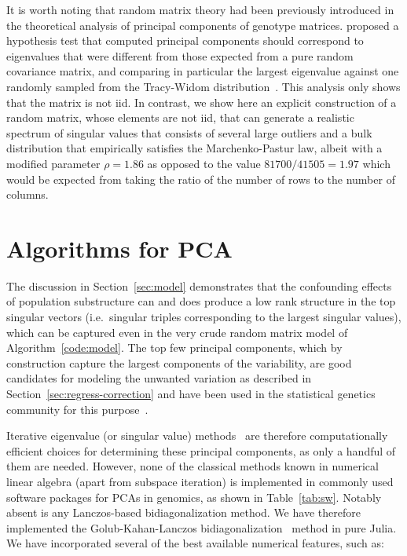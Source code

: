 \documentclass[review]{siamart0516}
\begin{document}
It is worth noting that random matrix theory had been previously introduced in
the theoretical analysis of principal components of genotype matrices.
\cite{Patterson2006} proposed a hypothesis test that computed principal components
should correspond to eigenvalues that were different from those expected from a
pure random covariance matrix,
and comparing in particular the largest eigenvalue against one randomly sampled
from the Tracy-Widom distribution~\cite{Tracy1993,Tracy1994}.
This analysis only shows that the matrix is not iid. In contrast, we show here
an explicit construction of a random matrix, whose elements are not iid, that
can generate a realistic spectrum of singular values that consists of several
large outliers and a bulk distribution that empirically satisfies the
Marchenko-Pastur law, albeit with a modified parameter $\rho = 1.86$ as opposed
to the value $81700/41505=1.97$ which would be expected from taking the ratio of
the number of rows to the number of columns.


\section{Algorithms for PCA}

The discussion in Section~\ref{sec:model} demonstrates that the
confounding effects of population substructure can and does produce a low
rank structure in the top singular vectors (i.e.\ singular triples
corresponding to the largest singular values), which can be captured even
in the very crude random matrix model of Algorithm~\ref{code:model}. The
top few principal components,
which by construction capture the largest components of the variability, are
good candidates for modeling the unwanted variation as described in
Section~\ref{sec:regress-correction} and have been used in the statistical
genetics community for this
purpose~\cite{Chen2003,Patterson2006,Price2006,Zhu2002,Zhang2003}.

Iterative eigenvalue (or singular value)
methods~\cite{Bai2000} are therefore computationally efficient choices for
determining these principal components, as only a handful of them are needed.
However, none of the classical methods known in numerical linear algebra
(apart from subspace iteration) is implemented in commonly used software packages
for PCAs in genomics, as shown in Table~\ref{tab:sw}.
Notably absent is any Lanczos-based bidiagonalization method.
We have therefore implemented the Golub-Kahan-Lanczos bidiagonalization~\cite{Golub1965}
method in pure Julia\cite{Bezanson2012,Bezanson2015}.
We have incorporated several of the best available numerical features, such as:
\end{document}
